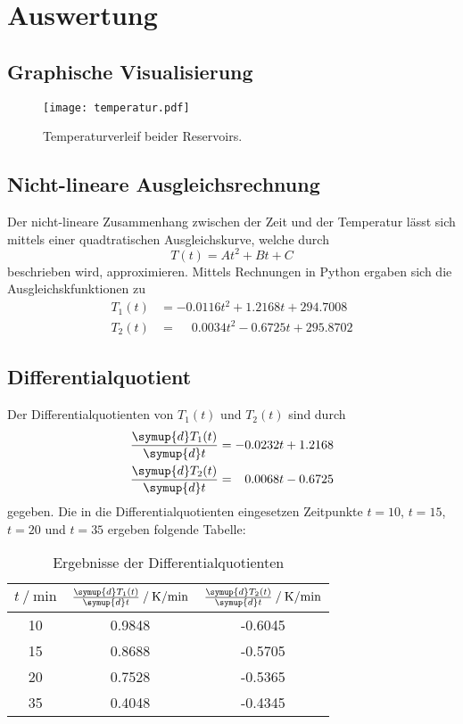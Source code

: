 \section{Auswertung}
\label{sec:Auswertung}
\subsection{Graphische Visualisierung}
\begin{figure}
  \centering
  \texttt{[image: temperatur.pdf]}
  \caption{Temperaturverleif beider Reservoirs.}
  \label{fig:temperatur}
\end{figure}
\subsection{Nicht-lineare Ausgleichsrechnung}
Der nicht-lineare Zusammenhang zwischen der Zeit und der Temperatur lässt sich mittels einer quadtratischen Ausgleichskurve, welche durch 
\begin{equation}
  T(t) = At^2 + Bt + C
\end{equation}
beschrieben wird, approximieren. Mittels Rechnungen in Python ergaben sich die Ausgleichskfunktionen zu
\begin{align}
  T_1(t) &= - 0.0116t^2 + 1.2168 t + 294.7008 \\
  T_2(t) &= \phantom{-}  0.0034 t^2 - 0.6725 t + 295.8702
\end{align}
\subsection{Differentialquotient}
Der Differentialquotienten von $T_1(t)$ und $T_2(t)$ sind durch
\begin{align}
  \frac{\symup{d} T_1(t)}{\symup{d}t} = - 0.0232t + 1.2168  \\
  \frac{\symup{d} T_2(t)}{\symup{d}t} = \phantom{-} 0.0068 t - 0.6725 
\end{align}
gegeben. Die in die Differentialquotienten eingesetzen Zeitpunkte $t = 10$, $t = 15$, $t = 20$ und $t = 35$ ergeben folgende Tabelle:
\begin{table}
  \centering
  \caption{Ergebnisse der Differentialquotienten}
  \label{tab:TabelleDifferentialquotient}
  \begin{tabular}{S[table-format = 2.0] S S}
    \toprule
    {$t \mathbin{/} \si{\minute}$} & {$\frac{\symup{d} T_1(t)}{\symup{d}t} \mathbin{/} \si{\kelvin\minute\tothe{-1}}$} & 
    {$\frac{\symup{d} T_2(t)}{\symup{d}t} \mathbin{/} \si{\kelvin\minute\tothe{-1}}$} \\
     & 0.9848 &-0.6045 \\
    15 & 0.8688 &-0.5705 \\
    20 & 0.7528 &-0.5365 \\
    35 & 0.4048 &-0.4345 \\
    \bottomrule                         
  \end{tabular}
\end{table}